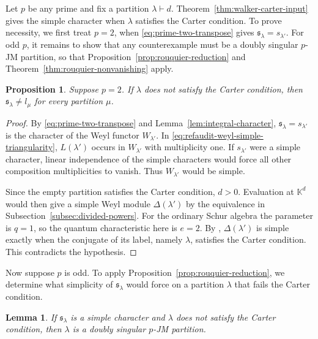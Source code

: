 \documentclass[12pt,reqno,a4paper]{amsart}
\numberwithin{equation}{section}
\numberwithin{figure}{section}
\theoremstyle{plain}
\newtheorem{proposition}[theorem]{Proposition}
\newtheorem{lemma}[theorem]{Lemma}
\theoremstyle{definition}
\begin{document}
Let $p$ be any prime and fix a partition $\lambda\vdash d$.
Theorem~\ref{thm:walker-carter-input}
gives the simple character when $\lambda$ satisfies the Carter condition.
To prove necessity, we first treat $p=2$, when \eqref{eq:prime-two-transpose}
gives $\mathfrak{s}_\lambda=s_{\lambda'}$.  For odd $p$, it remains
to show that any counterexample must be a doubly singular $p$-JM
partition, so that Proposition~\ref{prop:rouquier-reduction} and
Theorem~\ref{thm:rouquier-nonvanishing} apply.

\begin{proposition}\label{prop:prime-two}
Suppose $p=2$.  If $\lambda$ does not satisfy the Carter condition,
then $\mathfrak{s}_\lambda\neq l_\mu$ for every partition $\mu$.
\end{proposition}

\begin{proof}
By \eqref{eq:prime-two-transpose} and Lemma~\ref{lem:integral-character},
$\mathfrak{s}_\lambda=s_{\lambda'}$ is the character of the Weyl
functor $W_{\lambda'}$.  In \eqref{eq:refaudit-weyl-simple-triangularity},
$L(\lambda')$ occurs in $W_{\lambda'}$ with multiplicity one.  If
$s_{\lambda'}$ were a simple character, linear independence of the
simple characters would force all other composition multiplicities
to vanish.  Thus $W_{\lambda'}$ would be simple.

Since the empty partition satisfies the Carter condition, $d>0$.
Evaluation at $\mathbb K^d$ would then give a simple Weyl module
$\Delta(\lambda')$ by the equivalence in Subsection~\ref{subsec:divided-powers}.
For the ordinary Schur algebra the parameter is $q=1$, so the quantum
characteristic here is $e=2$.  By \cite[Proposition~1.2]{Fayers},
$\Delta(\lambda')$ is simple exactly when the conjugate of its label,
namely $\lambda$, satisfies the Carter condition.  This contradicts the
hypothesis.
\end{proof}

Now suppose $p$ is odd.  To apply Proposition~\ref{prop:rouquier-reduction},
we determine what simplicity of $\mathfrak{s}_\lambda$ would force on
a partition $\lambda$ that fails the Carter condition.

\begin{lemma}
\label{lem:initial-reduction}
If $\mathfrak{s}_\lambda$ is a simple character and $\lambda$ does
not satisfy the Carter condition, then $\lambda$ is a doubly
singular $p$-JM partition.
\end{lemma}
\end{document}

